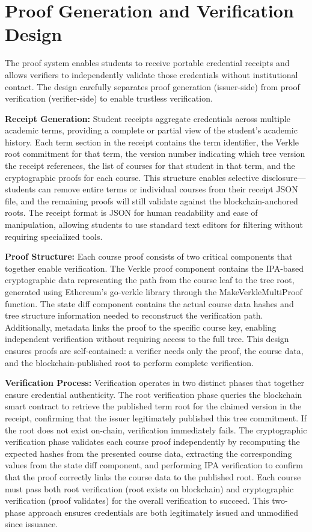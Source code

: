 \section{Proof Generation and Verification Design}
\label{sec:proof-design}

The proof system enables students to receive portable credential receipts and allows verifiers to independently validate those credentials without institutional contact. The design carefully separates proof generation (issuer-side) from proof verification (verifier-side) to enable trustless verification.

\textbf{Receipt Generation:} Student receipts aggregate credentials across multiple academic terms, providing a complete or partial view of the student's academic history. Each term section in the receipt contains the term identifier, the Verkle root commitment for that term, the version number indicating which tree version the receipt references, the list of courses for that student in that term, and the cryptographic proofs for each course. This structure enables selective disclosure—students can remove entire terms or individual courses from their receipt JSON file, and the remaining proofs will still validate against the blockchain-anchored roots. The receipt format is JSON for human readability and ease of manipulation, allowing students to use standard text editors for filtering without requiring specialized tools.

\textbf{Proof Structure:} Each course proof consists of two critical components that together enable verification. The Verkle proof component contains the IPA-based cryptographic data representing the path from the course leaf to the tree root, generated using Ethereum's go-verkle library through the MakeVerkleMultiProof function. The state diff component contains the actual course data hashes and tree structure information needed to reconstruct the verification path. Additionally, metadata links the proof to the specific course key, enabling independent verification without requiring access to the full tree. This design ensures proofs are self-contained: a verifier needs only the proof, the course data, and the blockchain-published root to perform complete verification.

\textbf{Verification Process:} Verification operates in two distinct phases that together ensure credential authenticity. The root verification phase queries the blockchain smart contract to retrieve the published term root for the claimed version in the receipt, confirming that the issuer legitimately published this tree commitment. If the root does not exist on-chain, verification immediately fails. The cryptographic verification phase validates each course proof independently by recomputing the expected hashes from the presented course data, extracting the corresponding values from the state diff component, and performing IPA verification to confirm that the proof correctly links the course data to the published root. Each course must pass both root verification (root exists on blockchain) and cryptographic verification (proof validates) for the overall verification to succeed. This two-phase approach ensures credentials are both legitimately issued and unmodified since issuance.

